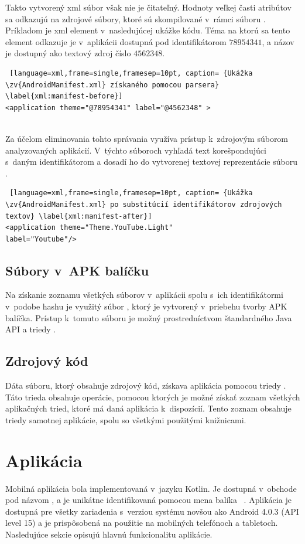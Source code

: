 Takto vytvorený xml súbor však nie je čitateľný. Hodnoty veľkej časti atribútov sa odkazujú na zdrojové súbory, ktoré sú skompilované v~rámci súboru . Príkladom je xml element  v~nasledujúcej ukážke kódu. Téma na ktorú sa tento element odkazuje je v~aplikácii dostupná pod identifikátorom $78954341$, a názov je dostupný ako textový zdroj číslo $4562348$.
\mbox{}\\
\begin{lstlisting} [language=xml,frame=single,framesep=10pt, caption= {Ukážka \zv{AndroidManifest.xml} získaného pomocou parsera} \label{xml:manifest-before}]
<application theme="@78954341" label="@4562348" >
\end{lstlisting}
\mbox{}\\
Za účelom eliminovania tohto správania využíva  prístup k~zdrojovým súborom analyzovaných aplikácií. V~týchto súboroch vyhľadá text korešpondujúci s~daným identifikátorom a dosadí ho do vytvorenej textovej reprezentácie súboru .
\mbox{}\\
\begin{lstlisting} [language=xml,frame=single,framesep=10pt, caption= {Ukážka \zv{AndroidManifest.xml} po substitúcií identifikátorov zdrojových textov} \label{xml:manifest-after}]
<application theme="Theme.YouTube.Light" 
label="Youtube"/>
\end{lstlisting}

\subsection{Súbory v~APK balíčku}
Na získanie zoznamu všetkých súborov v~aplikácii spolu s~ich identifikátormi v~podobe hashu je využitý súbor , ktorý je vytvorený v~priebehu tvorby APK balíčka.  Prístup k~tomuto súboru je možný prostredníctvom štandardného Java API a triedy .

\subsection{Zdrojový kód}
Dáta  súboru, ktorý obsahuje zdrojový kód, získava aplikácia pomocou triedy . Táto trieda obsahuje operácie, pomocou ktorých je možné získať zoznam všetkých aplikačných tried, ktoré má daná aplikácia k~dispozícií. Tento zoznam obsahuje triedy samotnej aplikácie, spolu so všetkými použitými knižnicami. 

	\section{Aplikácia}
Mobilná aplikácia bola implementovaná v~jazyku Kotlin. Je dostupná v~obchode  pod názvom , a je unikátne identifikovaná pomocou mena balíka ~\cite{gp}. Aplikácia je dostupná pre všetky zariadenia s~verziou systému novšou ako Android 4.0.3 (API level 15) a  je prispôsobená na použitie na mobilných telefónoch a tabletoch. Nasledujúce sekcie opisujú hlavnú funkcionalitu aplikácie.

